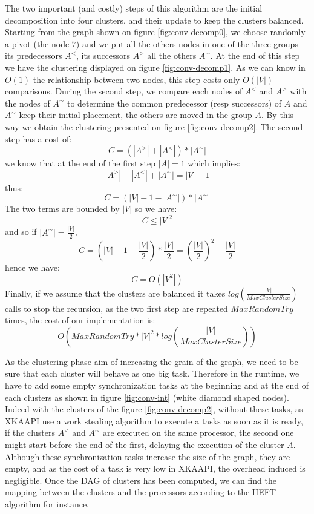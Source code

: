 \documentclass[10pt, conference, compsocconf,pdftex,dvipsnames]{IEEEtran}
\begin{document}
The two important (and costly) steps of this algorithm are the initial
decomposition into four clusters, and their update to keep the clusters
balanced.  Starting from the graph shown on figure \ref{fig:conv-decomp0}, we
choose randomly a pivot (the node $7$) and we put all the others nodes in one
of the three groups its predecessors $A^<$, its successors $A^>$ all the
others $A^{\sim}$. At the end of this step we have the clustering displayed on
figure \ref{fig:conv-decomp1}. As we can know in $O(1)$ the relationship
between two nodes, this step costs only $O(|V|)$ comparisons. During the second
step, we compare each nodes of $A^<$ and $A^>$ with the nodes of $A^{\sim}$ to
determine the common predecessor (resp successors) of $A$ and $A^{\sim}$ keep
their initial placement, the others are moved in the group $A$.  By this way
we obtain the clustering presented on figure \ref{fig:conv-decomp2}. The
second step has a cost of:
$$C=(|A^>|+|A^<|)*|A^{\sim}|$$ 
we know that at the end of the first step $|A|=1$ which implies: 
$$|A^>|+|A^<|+|A^{\sim}|=|V|-1$$
thus:
$$C=(|V|-1-|A^{\sim}|)*|A^{\sim}|$$ 
The two terms are bounded by $|V|$ so we have: 
$$C\leq|V|^2$$
and so if $|A^{\sim}|=\frac{|V|}{2}$,
$$C=(|V|-1-\frac{|V|}{2})*\frac{|V|}{2}=\left(\frac{|V|}{2}\right)^2-\frac{|V|}{2}$$
hence we have: 
$$C=O(|V^2|)$$ 
Finally, if we assume that the clusters are balanced it takes
$log\left(\frac{|V|}{MaxClusterSize}\right)$ calls to stop the recursion, as
the two first step are repeated $MaxRandomTry$ times, the
cost of our implementation is:
$$O\left(MaxRandomTry*|V|^2*log\left(\frac{|V|}{MaxClusterSize}\right)\right)$$

As the clustering phase aim of increasing the grain of the graph, we need to
be sure that each cluster will behave as one big task. Therefore in the
runtime, we have to add some empty synchronization tasks at the beginning and
at the end of each clusters as shown in figure \ref{fig:conv-int} (white
diamond shaped nodes). Indeed with the clusters of the figure
\ref{fig:conv-decomp2}, without these tasks,  as XKAAPI use a work stealing
algorithm to execute a tasks as soon as it is ready, if the clusters $A^<$ and
$A^{\sim}$ are executed on the same processor, the second one might start
before the end of the first, delaying the execution of the cluster $A$.
Although these synchronization tasks increase the size of the graph, they are
empty, and as the cost of a task is very low in XKAAPI, the overhead induced
is negligible. Once the DAG of clusters has been computed, we can find the
mapping between the clusters and the processors according to the HEFT
algorithm for instance. 
\end{document}
